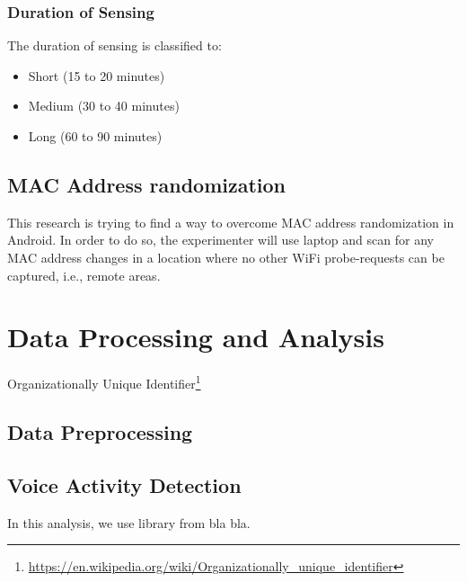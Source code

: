 \documentclass{article}
\begin{document}
\subsubsection*{Duration of Sensing} %
\label{ssub:duration_of_sensing}
The duration of sensing is classified to:
\begin{itemize}
	\item Short (15 to 20 minutes)
	\item Medium (30 to 40 minutes)
	\item Long (60 to 90 minutes)
\end{itemize}


\subsection{MAC Address randomization} %
\label{sub:mac_address_randomization}
This research is trying to find a way to overcome MAC address randomization in Android. In order to do so, the experimenter will use laptop and scan for any MAC address changes in a location where no other WiFi probe-requests can be captured, i.e., remote areas.

\section{Data Processing and Analysis} %
\label{sec:data_processing_and_analysis}
Organizationally Unique Identifier\footnote{\url{https://en.wikipedia.org/wiki/Organizationally_unique_identifier}}

\subsection{Data Preprocessing} %
\label{sub:data_preprocessing}


\subsection{Voice Activity Detection} %
\label{sub:voice_activity_detection}
In this analysis, we use library from bla bla.
\end{document}
